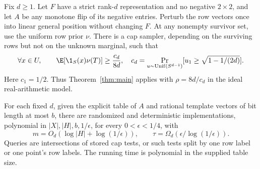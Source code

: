 \begin{theorem}\label{thm:caps}
Fix $d\ge1$. Let $F$ have a strict rank-$d$ representation and no negative $2\times2$, and let $A$ be any monotone flip of its negative entries. Perturb the row vectors once into linear general position without changing $F$. At any nonempty survivor set, use the uniform row prior $\nu$. There is a cap sampler, depending on the surviving rows but not on the unknown marginal, such that
\begin{equation}\label{eq:capcoverage}
 \forall x\in U,\qquad \E[\1_S(x)\nu(T)]\ge\frac{c_d}{8d},
 \quad c_d=\Pr_{u\sim\mathrm{Unif}(S^{d-1})}
 [u_1\ge\sqrt{1-1/(2d)}].
\end{equation}
Here $c_1=1/2$. Thus Theorem~\ref{thm:main} applies with $\rho=8d/c_d$ in the ideal real-arithmetic model.

For each fixed $d$, given the explicit table of $A$ and rational template vectors of bit length at most $b$, there are randomized and deterministic implementations, polynomial in $|X|,|H|,b,1/\epsilon$, for every $0<\epsilon<1/4$, with
\[
 m=O_d(\log|H|+\log(1/\epsilon)),\qquad
 \tau=\Omega_d(\epsilon/\log(1/\epsilon)).
\]
Queries are intersections of stored cap tests, or such tests split by one row label or one point's row labels. The running time is polynomial in the supplied table size.
\end{theorem}

